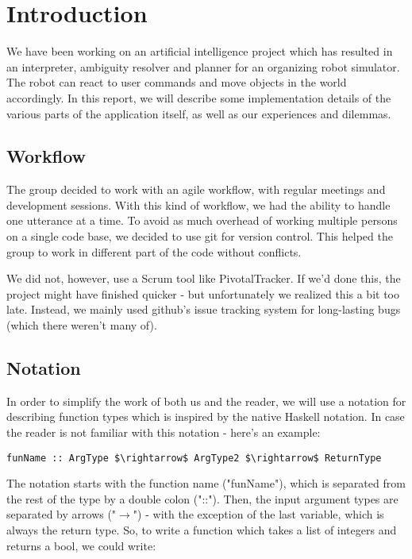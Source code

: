 \section*{Introduction}
We have been working on an artificial intelligence project which has resulted in an interpreter, ambiguity resolver and planner for an organizing robot simulator.
The robot can react to user commands and move objects in the world accordingly.
In this report, we will describe some implementation details of the various parts of the application itself, as well as our experiences and dilemmas.

\subsection*{Workflow}
The group decided to work with an agile workflow, with regular meetings and development sessions.
With this kind of workflow, we had the ability to handle one utterance at a time.
To avoid as much overhead of working multiple persons on a single code base, we decided to use git for version control.
This helped the group to work in different part of the code without conflicts.

We did not, however, use a Scrum tool like PivotalTracker. If we'd done this, the project might have finished quicker - but unfortunately we realized this a bit too late. Instead, we mainly used github's issue tracking system for long-lasting bugs (which there weren't many of).

\subsection*{Notation}
In order to simplify the work of both us and the reader, we will use a notation for describing function types which is inspired by the native Haskell notation.
In case the reader is not familiar with this notation - here's an example:

\begin{lstlisting}
funName :: ArgType $\rightarrow$ ArgType2 $\rightarrow$ ReturnType
\end{lstlisting}

The notation starts with the function name ("funName"), which is separated from the rest of the type by a double colon ("::").
Then, the input argument types are separated by arrows ("$\rightarrow$") - with the exception of the last variable, which is always the return type.
So, to write a function which takes a list of integers and returns a bool, we could write:

